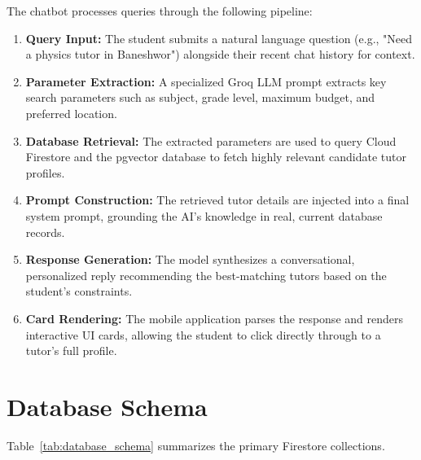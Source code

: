 \documentclass[12pt]{report}
\begin{document}
The chatbot processes queries through the following pipeline:
\begin{enumerate}
\item \textbf{Query Input:} The student submits a natural language question (e.g., "Need a physics tutor in Baneshwor") alongside their recent chat history for context.
\item \textbf{Parameter Extraction:} A specialized Groq LLM prompt extracts key search parameters such as subject, grade level, maximum budget, and preferred location.
\item \textbf{Database Retrieval:} The extracted parameters are used to query Cloud Firestore and the pgvector database to fetch highly relevant candidate tutor profiles.
\item \textbf{Prompt Construction:} The retrieved tutor details are injected into a final system prompt, grounding the AI's knowledge in real, current database records.
\item \textbf{Response Generation:} The model synthesizes a conversational, personalized reply recommending the best-matching tutors based on the student's constraints.
\item \textbf{Card Rendering:} The mobile application parses the response and renders interactive UI cards, allowing the student to click directly through to a tutor's full profile.
\end{enumerate}

\section{Database Schema}
Table~\ref{tab:database_schema} summarizes the primary Firestore collections.
\end{document}
